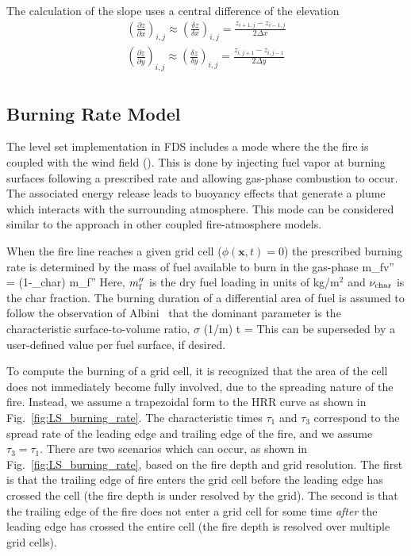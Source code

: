 The calculation of the slope uses a central difference of the elevation
\begin{gather}
\left(\frac{\partial z}{\partial x}\right)_{i, j} \approx \left(\frac{\delta z}{\delta x}\right)_{i, j} =
\frac{z_{i+1, j}-z_{i-1, j}}{2 \Delta x} \\[6pt]
\left(\frac{\partial z}{\partial y}\right)_{i, j} \approx \left(\frac{\delta z}{\delta y}\right)_{i, j} =
\frac{z_{i, j+1}-z_{i, j-1}}{2 \Delta y} \\[6pt]
\end{gather}


\subsection{Burning Rate Model}

The level set implementation in FDS includes a mode where the the fire is coupled with the wind field (). This is done by injecting fuel vapor at burning surfaces following a prescribed rate and allowing gas-phase combustion to occur. The associated energy release leads to buoyancy effects that generate a plume which interacts with the surrounding atmosphere. This mode can be considered similar to the approach in other coupled fire-atmosphere models.

When the fire line reaches a given grid cell ($\phi(\mathbf{x},t)=0$) the prescribed burning rate is determined by the mass of fuel available to burn in the gas-phase
\be
   m_{\rm fv}'' = (1-\nu_{\rm char}) m_{\rm f}''
\ee
Here, $m_{\rm f}''$ is the dry fuel loading in units of kg/m$^2$ and $\nu_{\rm char}$ is the char fraction. The burning duration of a differential area of fuel is assumed to follow the observation of Albini~\cite{Albini:1976} that the dominant parameter is the characteristic surface-to-volume ratio, $\sigma$ (1/m) 
\be
	\delta t = 
\ee
This can be superseded by a user-defined value per fuel surface, if desired.

To compute the burning of a grid cell, it is recognized that the area of the cell does not immediately become fully involved, due to the spreading nature of the fire. Instead, we assume a trapezoidal form to the HRR curve as shown in Fig.~\ref{fig:LS_burning_rate}. The characteristic times $\tau_1$ and $\tau_3$ correspond to the spread rate of the leading edge and trailing edge of the fire, and we assume $\tau_3 = \tau_1$. There are two scenarios which can occur, as shown in Fig.~\ref{fig:LS_burning_rate}, based on the fire depth and grid resolution. The first is that the trailing edge of fire enters the grid cell before the leading edge has crossed the cell (the fire depth is under resolved by the grid). The second is that the trailing edge of the fire does not enter a grid cell for some time {\it after} the leading edge has crossed the entire cell (the fire depth is resolved over multiple grid cells).

